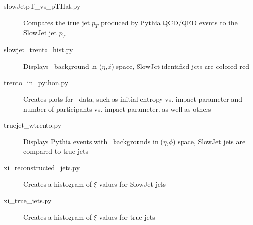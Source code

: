 \documentclass[11pt]{article}
\begin{document}
\begin{description}
\item[slowJetpT\_vs\_pTHat.py] Compares the true jet $p_T$ produced by Pythia QCD/QED events to the SlowJet jet $p_T$ 
\item[slowjet\_trento\_hist.py] Displays \trento\ background in ($\eta$,$\phi$) space, SlowJet identified jets are colored red
\item[trento\_in\_python.py] Creates plots for \trento\ data, such as initial entropy vs. impact parameter and number of participants vs. impact parameter, as well as others
\item[truejet\_wtrento.py] Displays Pythia events with \trento\ backgrounds in ($\eta$,$\phi$) space, SlowJet jets are compared to true jets
\item[xi\_reconstructed\_jets.py] Creates a histogram of $\xi$ values for SlowJet jets
\item[xi\_true\_jets.py] Creates a histogram of $\xi$ values for true jets
\end{description}
\end{document}
